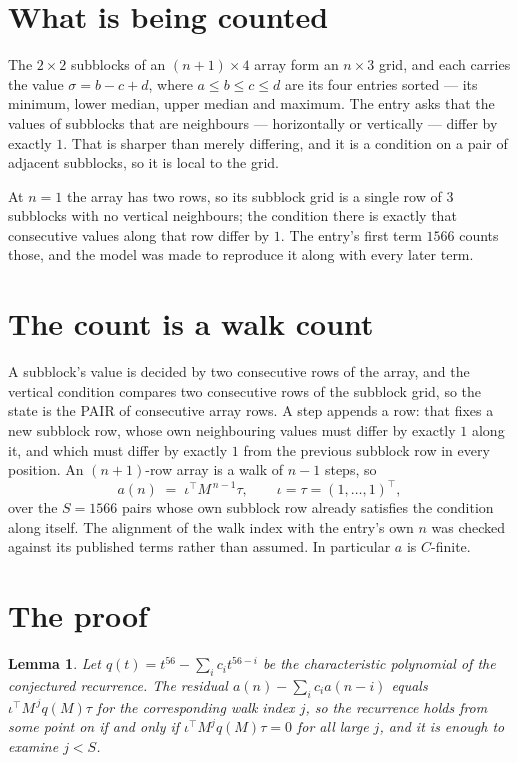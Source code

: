 \documentclass[11pt,a4paper]{article}
\theoremstyle{plain}
\newtheorem{lemma}[theorem]{Lemma}
\theoremstyle{definition}
\begin{document}
\section{What is being counted}

The $2\times2$ subblocks of an $(n+1)\times4$ array form an
$n\times3$ grid, and each carries the value $\sigma=b-c+d$, where $a\le b\le c\le d$ are its four entries sorted --- its minimum, lower median, upper median and maximum. The entry asks that the values of
subblocks that are neighbours --- horizontally or vertically --- differ by exactly $1$.
That is sharper than merely differing, and it is a condition on a pair of adjacent subblocks,
so it is local to the grid.

At $n=1$ the array has two rows, so its subblock grid is a single row of $3$ subblocks with
no vertical neighbours; the condition there is exactly that consecutive values along that row
differ by $1$. The entry's first term $1566$ counts those, and the model was made to
reproduce it along with every later term.

\section{The count is a walk count}

A subblock's value is decided by two consecutive rows of the array, and the
vertical condition compares two consecutive rows of the subblock grid, so the state is the
PAIR of consecutive array rows. A step appends a row: that fixes a new subblock row, whose own
neighbouring values must differ by exactly $1$ along it, and which must differ by exactly
$1$ from the previous subblock row in every position. An $(n+1)$-row array is a walk of
$n-1$ steps, so
\[
a(n)\;=\;\iota^{\!\top}M^{\,n-1}\tau,\qquad\iota=\tau=(1,\dots,1)^{\!\top},
\]
over the $S=1566$ pairs whose own subblock row already satisfies the condition along itself.
The alignment of the walk index with the entry's own $n$ was checked against its published
terms rather than assumed. In particular $a$ is $C$-finite.

\section{The proof}

\begin{lemma}\label{lem:crit}
Let $q(t)=t^{56}-\sum_i c_it^{56-i}$ be the characteristic polynomial of the
conjectured recurrence. The residual $a(n)-\sum_ic_ia(n-i)$ equals
$\iota^{\!\top}M^{\,j}q(M)\tau$ for the corresponding walk index $j$, so the recurrence
holds from some point on if and only if $\iota^{\!\top}M^{j}q(M)\tau=0$ for all large $j$,
and it is enough to examine $j<S$.
\end{lemma}
\end{document}
